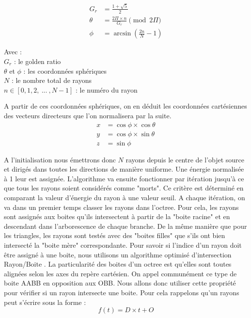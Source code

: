 \begin{align}
G_r &= \frac{1 + \sqrt{5}}{2} \\
\theta &= \frac{2 \Pi \times n}{G_r}  \pmod{2\Pi} \\
\phi &= \arcsin{(\frac{2n}{N}-1)} 
\end{align}

Avec : \\
$G_r$ : le golden ratio \\
$\theta$ et $\phi$ : les coordonnées sphériques \\
$N$ : le nombre total de rayons \\
$n \in[0, 1, 2, \ ... \ ,N-1]$ : le numéro du rayon 

A partir de ces coordonnées sphériques, on en déduit les coordonnées cartésiennes des vecteurs directeurs que l'on normalisera par la suite.
\begin{align}
x &= \cos{\phi} \times \cos{\theta} \\
y &= \cos{\phi} \times \sin{\theta} \\
z &= \sin{\phi}
\end{align}


A l'initialisation nous émettrons donc $N$ rayons depuis le centre de l'objet source et dirigés dans toutes les directions de manière uniforme. Une énergie normalisée à 1 leur est assignée. L'algorithme va ensuite fonctionner par itération jusqu'à ce que tous les rayons soient considérés comme "morts". Ce critère est déterminé en comparant la valeur d'énergie du rayon à une valeur seuil. A chaque itération, on va dans un premier temps classer les rayons dans l'\gls{octree}. Pour cela, les rayons sont assignés aux boites qu'ils intersectent à partir de la "boite racine" et en descendant dans l'arborescence de chaque branche. De la même manière que pour les triangles, les rayons sont testés avec des "boites filles" que s'ils ont bien intersecté la "boite mère" correspondante. Pour savoir si l'indice d'un rayon doit être assigné à une boite, nous utilisons un algorithme optimisé d'intersection Rayon/Boite \cite{AABB}. La particularité des boites d'un \gls{octree} est qu'elles sont toutes alignées selon les axes du repère cartésien. On appel communément ce type de boite \gls{AABB} en opposition aux \gls{OBB}. Nous allons donc utiliser cette propriété pour vérifier si un rayon intersecte une boite. Pour cela rappelons qu'un rayons peut s'écrire sous la forme : 
\begin{equation}
f(t) = D \times t + O
\end{equation}

